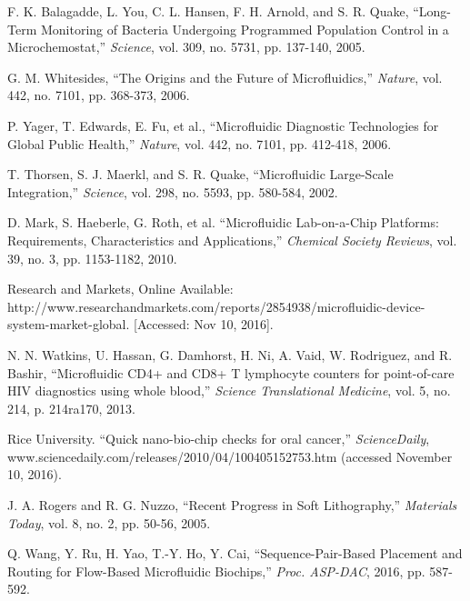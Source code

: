 \documentclass[journal]{IEEEtran}
\begin{document}
\begin{thebibliography}{99}
{
\balance 

F. K. Balagadde, L. You, C. L. Hansen, F. H. Arnold, and S. R. Quake, 
``Long-Term Monitoring of Bacteria Undergoing Programmed Population Control in a Microchemostat,'' 
{\em Science}, 
vol. 309, no. 5731, pp. 137-140, 2005.

G. M. Whitesides, 
``The Origins and the Future of Microfluidics,'' 
{\em Nature}, 
vol. 442, no. 7101, pp. 368-373, 2006.

P. Yager, T. Edwards, E. Fu, et al., %
``Microfluidic Diagnostic Technologies for Global Public Health,'' 
{\em Nature}, 
vol. 442, no. 7101, pp. 412-418, 2006.

T. Thorsen, S. J. Maerkl, and S. R. Quake, 
``Microfluidic Large-Scale Integration,'' 
{\em Science}, 
vol. 298, no. 5593, pp. 580-584, 2002.

D. Mark, S. Haeberle, G. Roth, et al. %
``Microfluidic Lab-on-a-Chip Platforms: Requirements, Characteristics and Applications,''
{\em Chemical Society Reviews},
vol. 39, no. 3, pp. 1153-1182, 2010.

Research and Markets, Online Available: http://www.researchandmarkets.com/reports/2854938/microfluidic-device-system-market-global. [Accessed: Nov 10, 2016].

N. N. Watkins, U. Hassan, G. Damhorst, H. Ni, A. Vaid, W. Rodriguez, and R. Bashir,
``Microfluidic CD4+ and CD8+ T lymphocyte counters for point-of-care HIV diagnostics using whole blood,''
{\em Science Translational Medicine},
vol. 5, no. 214, p. 214ra170, 2013.


Rice University. ``Quick nano-bio-chip checks for oral cancer,''
{\em ScienceDaily}, www.sciencedaily.com/releases/2010/04/100405152753.htm (accessed November 10, 2016).

J. A. Rogers and R. G. Nuzzo, 
``Recent Progress in Soft Lithography,''
{\em Materials Today}, 
vol. 8, no. 2, pp. 50-56, 2005.


Q. Wang, Y. Ru, H. Yao, T.-Y. Ho, Y. Cai,
``Sequence-Pair-Based Placement and Routing for Flow-Based Microfluidic Biochips,''
{\em Proc. ASP-DAC}, 
2016, pp. 587-592.

}
\end{thebibliography}
\end{document}
